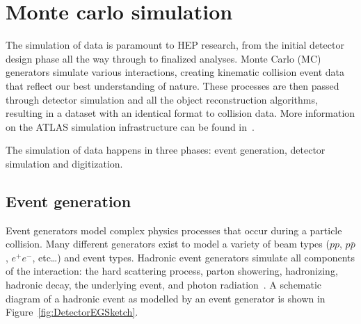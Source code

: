 \section{Monte carlo simulation} \label{DetectorMC}

The simulation of data is paramount to HEP research, from the initial detector design phase all the way through to finalized analyses. Monte Carlo (MC) generators simulate various interactions, creating kinematic collision event data that reflect our best understanding of nature. These processes are then passed through detector simulation and all the object reconstruction algorithms, resulting in a dataset with an identical format to collision data. More information on the ATLAS simulation infrastructure can be found in~\cite{Detector:ATLASSimulationInfra}.

The simulation of data happens in three phases: event generation, detector simulation and digitization. 

\subsection{Event generation} \label{DetectorEventGeneration}

Event generators model complex physics processes that occur during a particle collision. Many different generators exist to model a variety of beam types ($pp$, $p\bar{p}$, $e^+e^-$, etc\ldots) and event types. Hadronic event generators simulate all components of the interaction: the hard scattering process, parton showering, hadronizing, hadronic decay, the underlying event, and photon radiation~\cite{Les}. A schematic diagram of a hadronic event as modelled by an event generator is shown in Figure~\ref{fig:DetectorEGSketch}.

